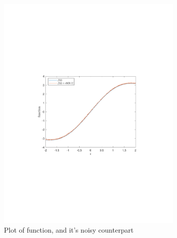 \documentclass[a4paper]{article}
\begin{document}
\begin{figure}[H]
	\centering
	\begin{subfigure}{0.49\textwidth}
	\centering
	\includegraphics[trim={4cm 8cm 4cm 8cm},clip,width=1\textwidth]{Images/FuncNoise.pdf}
	\caption{Plot of function, and it's noisy counterpart}
	\label{sub:FuncNoiseD=0}
\end{subfigure}
	\begin{subfigure}{0.49\textwidth}
		\centering

\end{subfigure}
\end{figure}
\end{document}
